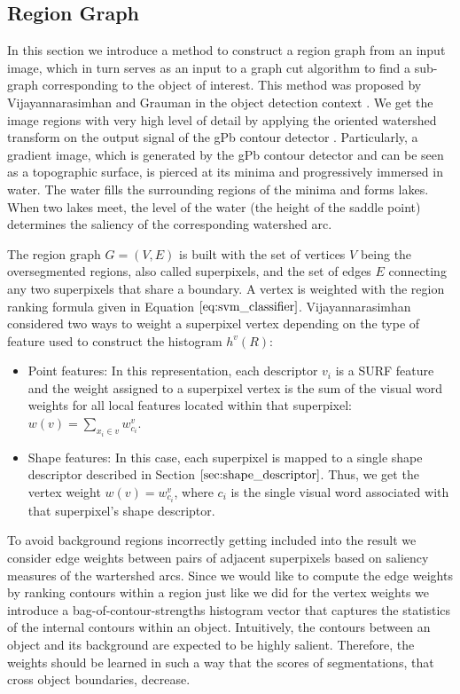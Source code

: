 \documentclass{SMBV13}
\begin{document}
\subsection{Region Graph}
\label{sec:region_graph}
In this section we introduce a method to construct a region graph from an input image, which in turn serves as an input to a graph cut algorithm to find a sub-graph corresponding to the object of interest. This method was proposed by Vijayannarasimhan and Grauman in the object detection context \cite{VijayGrauman2011}. We get the image regions with very high level of detail by applying the oriented watershed transform on the output signal of the gPb contour detector \cite{arbelaez2009contours}. Particularly, a gradient image, which is generated by the gPb contour detector and can be seen as a topographic surface, is pierced at its minima and progressively immersed in water. The water fills the surrounding regions of the minima and forms lakes. When two lakes meet, the level of the water (the height of the saddle point) determines the saliency of the corresponding watershed arc.

The region graph $G = (V, E)$ is built with the set of vertices $V$ being the oversegmented regions, also called superpixels, and the set of edges $E$ connecting any two superpixels that share a boundary. A vertex is weighted with the region ranking formula given in Equation $\ref{eq:svm_classifier}$. Vijayannarasimhan considered two ways to weight a superpixel vertex depending on the type of feature used to construct the histogram $h^v(R)$:

\begin{itemize}
\item Point features: In this representation, each descriptor $v_i$ is a SURF feature and the weight assigned to a superpixel vertex is the sum of the visual word weights for all local features located within that superpixel: $w(v) = \sum_{x_i \in v} w^v_{c_i}$.
\item Shape features: In this case, each superpixel is mapped to a single shape descriptor described in Section $\ref{sec:shape_descriptor}$. Thus, we get the vertex weight $w(v) = w^v_{c_i}$, where $c_i$ is the single visual word associated with that superpixel's shape descriptor.
\end{itemize}

To avoid background regions incorrectly getting included into the result we consider edge weights between pairs of adjacent superpixels based on saliency measures of the wartershed arcs. Since we would like to compute the edge weights by ranking contours within a region just like we did for the vertex weights we introduce a bag-of-contour-strengths histogram vector that captures the statistics of the internal contours within an object. Intuitively, the contours between an object and its background are expected to be highly salient. Therefore, the weights should be learned in such a way that the scores of segmentations, that cross object boundaries, decrease.
\end{document}

